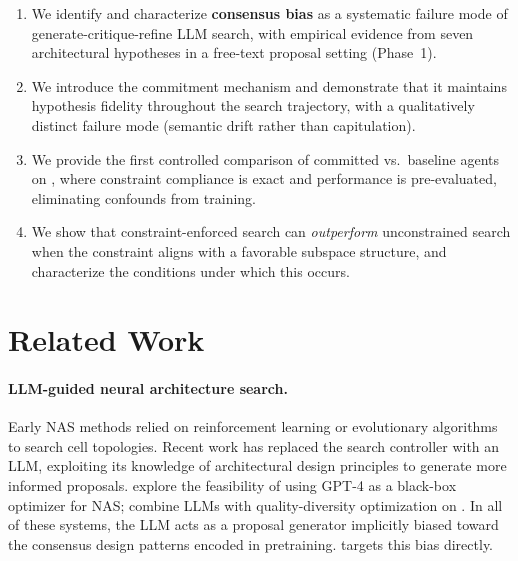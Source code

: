 \begin{enumerate}
  \item We identify and characterize \textbf{consensus bias} as a systematic
    failure mode of generate-critique-refine LLM search, with empirical evidence
    from seven architectural hypotheses in a free-text proposal setting (Phase~1).

  \item We introduce the \haas{} commitment mechanism and demonstrate that it
    maintains hypothesis fidelity throughout the search trajectory, with a
    qualitatively distinct failure mode (semantic drift rather than capitulation).

  \item We provide the first controlled comparison of committed vs.\ baseline
    agents on \nasbench{} \citep{dong2020nasbench201}, where constraint compliance
    is exact and performance is pre-evaluated, eliminating confounds from training.

  \item We show that constraint-enforced search can \emph{outperform}
    unconstrained search when the constraint aligns with a favorable subspace
    structure, and characterize the conditions under which this occurs.
\end{enumerate}

\section{Related Work}
\label{sec:related}

\paragraph{LLM-guided neural architecture search.}
Early NAS methods relied on reinforcement learning \citep{zoph2017neural} or
evolutionary algorithms \citep{real2019regularized} to search cell topologies.
Recent work has replaced the search controller with an LLM, exploiting its
knowledge of architectural design principles to generate more informed proposals.
\citet{zheng2023can} explore the feasibility of using GPT-4 as a black-box
optimizer for NAS; \citet{nasir2024llmatic} combine LLMs with quality-diversity
optimization on \nasbench{}. In all of these systems, the LLM acts as a proposal
generator implicitly biased toward the consensus design patterns encoded in
pretraining. \haas{} targets this bias directly.

